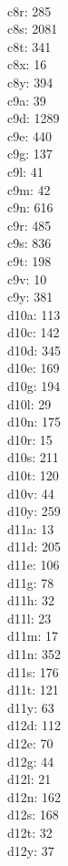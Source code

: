 \begin{multicols}{8}
  \\ c8r: 285
  \\ c8s: 2081
  \\ c8t: 341
  \\ c8x: 16
  \\ c8y: 394
  \\ c9a: 39
  \\ c9d: 1289
  \\ c9e: 440
  \\ c9g: 137
  \\ c9l: 41
  \\ c9m: 42
  \\ c9n: 616
  \\ c9r: 485
  \\ c9s: 836
  \\ c9t: 198
  \\ c9v: 10
  \\ c9y: 381
  \\ d10a: 113
  \\ d10c: 142
  \\ d10d: 345
  \\ d10e: 169
  \\ d10g: 194
  \\ d10l: 29
  \\ d10n: 175
  \\ d10r: 15
  \\ d10s: 211
  \\ d10t: 120
  \\ d10v: 44
  \\ d10y: 259
  \\ d11a: 13
  \\ d11d: 205
  \\ d11e: 106
  \\ d11g: 78
  \\ d11h: 32
  \\ d11l: 23
  \\ d11m: 17
  \\ d11n: 352
  \\ d11s: 176
  \\ d11t: 121
  \\ d11y: 63
  \\ d12d: 112
  \\ d12e: 70
  \\ d12g: 44
  \\ d12l: 21
  \\ d12n: 162
  \\ d12s: 168
  \\ d12t: 32
  \\ d12y: 37

\end{multicols}
